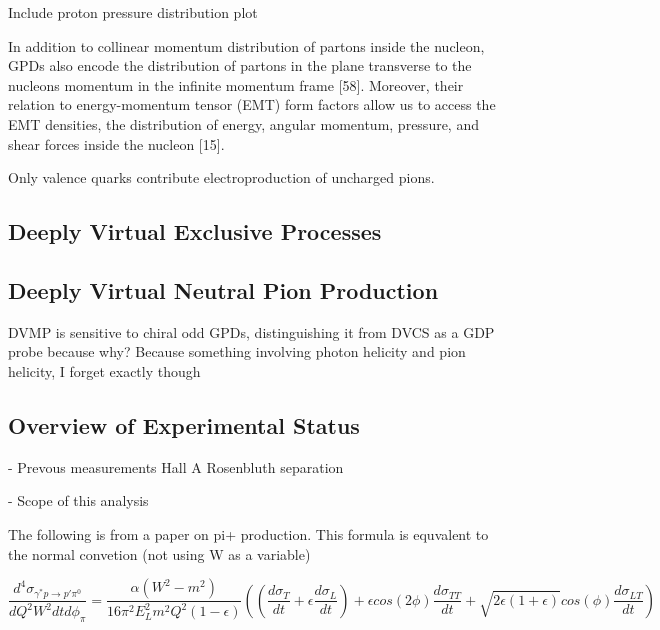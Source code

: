     
    


    

        Include proton pressure distribution plot

      


In addition to collinear momentum distribution of partons inside the
nucleon, GPDs also encode the distribution of partons in the plane transverse to
the nucleons momentum in the infinite momentum frame [58]. Moreover, their
relation to energy-momentum tensor (EMT) form factors allow us to access the
EMT densities, the distribution of energy, angular momentum, pressure, and shear
forces inside the nucleon [15].

Only valence quarks contribute electroproduction of uncharged pions.


    \subsection{Deeply Virtual Exclusive Processes}

\subsection{Deeply Virtual Neutral Pion Production}


 DVMP is sensitive to chiral odd GPDs, distinguishing it from DVCS as a GDP probe because why? Because something involving photon helicity and pion helicity, I forget exactly though


    \subsection{Overview of Experimental Status}
     - Prevous measurements
     Hall A Rosenbluth separation \cite{Defurne2016RosenbluthSection}

     
     - Scope of this analysis
    





\iffalse
        The following is from a paper on pi+ production. This formula is equvalent to the normal convetion (not using W as a variable)
        
         \begin{equation}\label{xsec}
             \frac{d^4\sigma_{\gamma^*p \rightarrow p'\pi^0}}{dQ^2W^2dtd\phi_{\pi}} =
             \frac{\alpha (W^2-m^2)}{16\pi^2 E^2_L m^2 Q^2 (1-\epsilon)}
             ((\frac{d\sigma_T}{dt}+\epsilon\frac{d\sigma_L}{dt})+
             \epsilon cos(2\phi) \frac{d\sigma_{TT}}{dt} + \sqrt{2\epsilon(1+\epsilon)}cos(\phi)\frac{d\sigma_{LT}}{dt})
        \end{equation}
        
